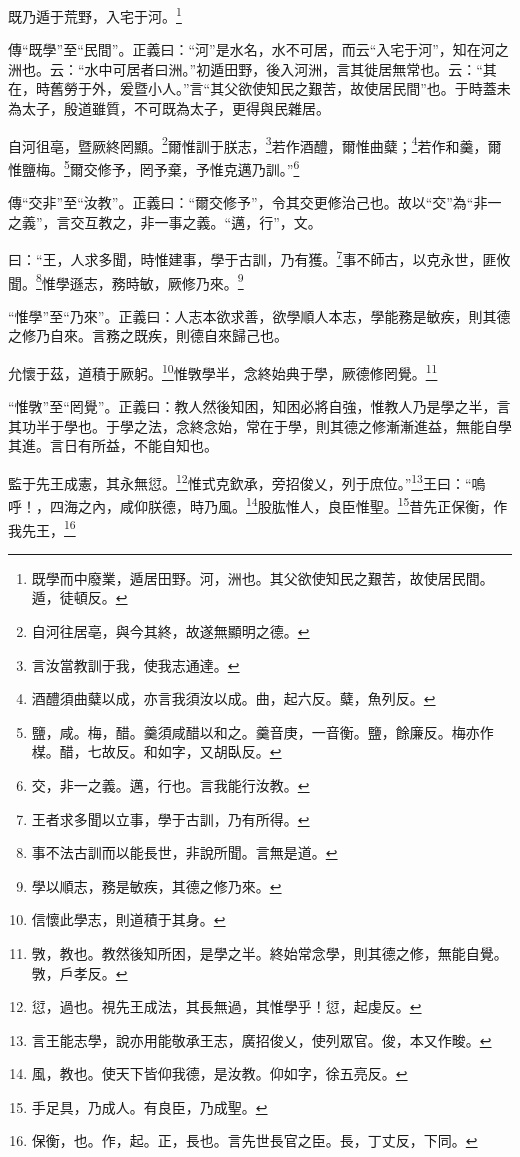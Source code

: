 既乃遁于荒野，入宅于河。\footnote{既學而中廢業，遁居田野。河，洲也。其父欲使知民之艱苦，故使居民間。遁，徒頓反。}

{\noindent\zhuan{}\fzbyks 傳“既學”至“民間”。正義曰：“河”是水名，水不可居，而云“入宅于河”，知在河之洲也。云：“水中可居者曰洲。”初遁田野，後入河洲，言其徙居無常也。云：“其在，時舊勞于外，爰暨小人。”言“其父欲使知民之艱苦，故使居民間”也。于時蓋未為太子，殷道雖質，不可既為太子，更得與民雜居。 \par}

自河徂亳，暨厥終罔顯。\footnote{自河往居亳，與今其終，故遂無顯明之德。}爾惟訓于朕志，\footnote{言汝當教訓于我，使我志通達。}若作酒醴，爾惟曲糵；\footnote{酒醴須曲糵以成，亦言我須汝以成。曲，起六反。糵，魚列反。}若作和羹，爾惟鹽梅。\footnote{鹽，咸。梅，醋。羹須咸醋以和之。羹音庚，一音衡。鹽，餘廉反。梅亦作楳。醋，七故反。和如字，又胡臥反。}爾交修予，罔予棄，予惟克邁乃訓。”\footnote{交，非一之義。邁，行也。言我能行汝教。}

{\noindent\zhuan{}\fzbyks 傳“交非”至“汝教”。正義曰：“爾交修予”，令其交更修治己也。故以“交”為“非一之義”，言交互教之，非一事之義。“邁，行”，文。 \par}

曰：“王，人求多聞，時惟建事，學于古訓，乃有獲。\footnote{王者求多聞以立事，學于古訓，乃有所得。}事不師古，以克永世，匪攸聞。\footnote{事不法古訓而以能長世，非說所聞。言無是道。}惟學遜志，務時敏，厥修乃來。\footnote{學以順志，務是敏疾，其德之修乃來。}

{\noindent\shu{}\fzkt “惟學”至“乃來”。正義曰：人志本欲求善，欲學順人本志，學能務是敏疾，則其德之修乃自來。言務之既疾，則德自來歸己也。 \par}

允懷于茲，道積于厥躬。\footnote{信懷此學志，則道積于其身。}惟斆學半，念終始典于學，厥德修罔覺。\footnote{斆，教也。教然後知所困，是學之半。終始常念學，則其德之修，無能自覺。斆，戶孝反。}

{\noindent\shu{}\fzkt “惟斆”至“罔覺”。正義曰：教人然後知困，知困必將自強，惟教人乃是學之半，言其功半于學也。于學之法，念終念始，常在于學，則其德之修漸漸進益，無能自學其進。言日有所益，不能自知也。 \par}

監于先王成憲，其永無愆。\footnote{愆，過也。視先王成法，其長無過，其惟學乎！愆，起虔反。}惟式克欽承，旁招俊乂，列于庶位。”\footnote{言王能志學，說亦用能敬承王志，廣招俊乂，使列眾官。俊，本又作畯。}王曰：“嗚呼！，四海之內，咸仰朕德，時乃風。\footnote{風，教也。使天下皆仰我德，是汝教。仰如字，徐五亮反。}股肱惟人，良臣惟聖。\footnote{手足具，乃成人。有良臣，乃成聖。}昔先正保衡，作我先王，\footnote{保衡，也。作，起。正，長也。言先世長官之臣。長，丁丈反，下同。}

